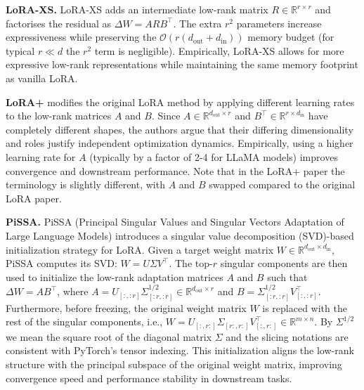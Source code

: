 \documentclass[a4paper,10pt,twocolumn,english]{article}
\begin{document}
\noindent\textbf{LoRA-XS.}  LoRA-XS \cite{balazy2024loraxslowrankadaptationextremely} adds an intermediate low-rank matrix $R\!\in\!\mathbb{R}^{r\times r}$ and factorises the residual as $\Delta W = A R B^{\top}$.  The extra $r^{2}$ parameters increase expressiveness while preserving the $\mathcal{O}(r(d_{\text{out}}+d_{\text{in}}))$ memory budget (for typical $r\!\ll\!d$ the $r^{2}$ term is negligible). Empirically, LoRA-XS allows for more expressive low-rank representations while maintaining the same memory footprint as vanilla LoRA.

\noindent\textbf{LoRA+}\cite{hayou2024loraefficientlowrank} modifies the original LoRA method by applying different learning rates to the low-rank matrices $A$ and $B$. Since $A\!\in\!\mathbb{R}^{d_{\text{out}}\times r}$ and $B^\top\!\in\!\mathbb{R}^{r\times d_{\text{in}}}$ have completely different shapes, the authors argue that their differing dimensionality and roles justify independent optimization dynamics. Empirically, using a higher learning rate for $A$ (typically by a factor of 2-4 for LLaMA models) improves convergence and downstream performance. Note that in the LoRA+ paper the terminology is slightly different, with $A$ and $B$ swapped compared to the original LoRA paper.

\noindent\textbf{PiSSA.} PiSSA\cite{meng2025pissaprincipalsingularvalues} (Principal Singular Values and Singular Vectors Adaptation of Large Language Models) introduces a singular value decomposition (SVD)-based initialization strategy for LoRA. Given a target weight matrix \( W \in \mathbb{R}^{d_{\text{out}} \times d_{\text{in}}} \), PiSSA computes its SVD: \( W = U \Sigma V^\top \). The top-\( r \) singular components are then used to initialize the low-rank adaptation matrices \( A \) and \( B \) such that \( \Delta W = AB^\top \), where \( A = U_{[:, :r]} \Sigma^{1 / 2}_{[:r, :r]} \in \mathbb{R}^{d_{\text{out}} \times r} \) and \( B = \Sigma^{1 / 2}_{[:r, :r]} V^\top_{[:, :r]} \). Furthermore, before freezing, the original weight matrix $W$ is replaced with the rest of the singular components, i.e., \( W = U_{[:, r:]} \Sigma_{[r:, r:]} V^\top_{[:, r:]} \in \mathbb{R}^{m \times n} \). By $\Sigma^{1 / 2}$ we mean the square root of the diagonal matrix $\Sigma$ and the slicing notations are consistent with PyTorch's tensor indexing. This initialization aligns the low-rank structure with the principal subspace of the original weight matrix, improving convergence speed and performance stability in downstream tasks.


\end{document}
